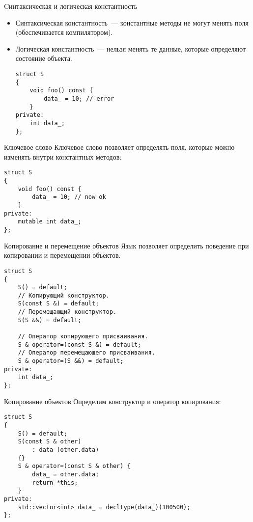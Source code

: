 \documentclass{beamer}
\begin{document}
\begin{frame}[fragile]{Cинтаксическая и логическая константность}{}
    \begin{itemize}
    \item Синтаксическая константность~--- константные методы
        не могут менять поля (обеспечивается компилятором).
    \item Логическая константность~--- нельзя менять те данные, 
        которые определяют состояние объекта.
        \begin{lstlisting}
struct S 
{
    void foo() const {
        data_ = 10; // error
    }
private:
    int data_;
};
        \end{lstlisting}
    \end{itemize}
\end{frame}

\begin{frame}[fragile]{Ключевое слово }{}
    Ключевое слово  позволяет определять поля,
    которые можно изменять внутри константных методов:
    \begin{lstlisting}
struct S 
{
    void foo() const {
        data_ = 10; // now ok
    }
private:
    mutable int data_;
};
    \end{lstlisting}
\end{frame}

\begin{frame}[fragile]{Копирование и перемещение объектов}{}
    Язык \langcpp позволяет определить поведение при копировании и перемещении объектов.
    \begin{lstlisting}
struct S 
{
    S() = default;
    // Копирующий конструктор.
    S(const S &) = default;
    // Перемещающий конструктор.
    S(S &&) = default;

    // Оператор копирующего присваивания.
    S & operator=(const S &) = default;
    // Оператор перемещающего присваивания.
    S & operator=(S &&) = default;
private:
    int data_;
};
    \end{lstlisting}
\end{frame}

\begin{frame}[fragile]{Копирование объектов}{}
    Определим конструктор и оператор копирования:
    \begin{lstlisting}
struct S 
{
    S() = default;
    S(const S & other)
        : data_(other.data)
    {}
    S & operator=(const S & other) {
        data_ = other.data;
        return *this;
    }
private:
    std::vector<int> data_ = decltype(data_)(100500);
};
    \end{lstlisting}
\end{frame}
\end{document}
